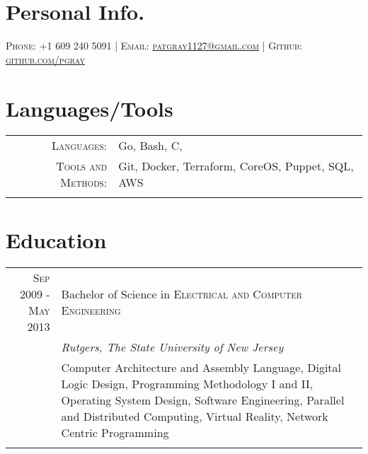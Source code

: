 \documentclass[a4paper, 10pt, onepage]{article} %
\begin{document}
\pagestyle{empty} 
\par{\par}
\par{\par}

\section{Personal Info.}
\centering\textsc{{Phone:} +1 609 240 5091 | {Email:}  \href{mailto:patgray1127@gmail.com}{patgray1127@gmail.com} | {Github:}  \href{http://github.com/pgray}{github.com/pgray}}\\

\section{Languages/Tools}
\begin{tabular}{rp{10cm}}
\textsc{Languages:} & Go, Bash, C, \\
\textsc{Tools and Methods:} & Git, Docker, Terraform, CoreOS, Puppet, SQL, AWS\\
\multicolumn{2}{c}{}\\
\end{tabular}

\section{Education}
\begin{tabular}{r|p{10cm}}	
\textsc{Sep 2009 - May 2013} & Bachelor of Science in \textsc{Electrical and Computer Engineering}\\
& \small\emph{Rutgers, The State University of New Jersey}\\
& \footnotesize{Computer Architecture and Assembly Language, Digital Logic Design, Programming Methodology I and II, Operating System Design, Software Engineering, Parallel and Distributed Computing, Virtual Reality, Network Centric Programming}\\
\multicolumn{2}{c}{}\\
\end{tabular}
\end{document}
